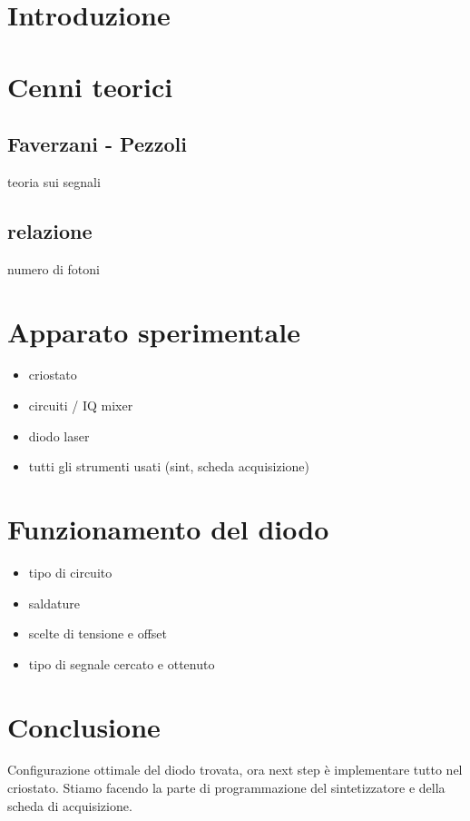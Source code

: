 \documentclass[class]{article}
\begin{document}
\section{Introduzione}

\section{Cenni teorici}
\subsection{Faverzani - Pezzoli}
teoria sui segnali
\subsection{relazione}
numero di fotoni

\section{Apparato sperimentale}
\begin{itemize}
    \item criostato
    \item circuiti / IQ mixer
    \item diodo laser
    \item tutti gli strumenti usati (sint, scheda acquisizione)
\end{itemize}

\section{Funzionamento del diodo}
\begin{itemize}
    \item tipo di circuito
    \item saldature
    \item scelte di tensione e offset
    \item tipo di segnale cercato e ottenuto
\end{itemize}

\section{Conclusione}
Configurazione ottimale del diodo trovata, ora next step è implementare tutto nel criostato.
Stiamo facendo la parte di programmazione del sintetizzatore e della scheda di acquisizione.
\end{document}
